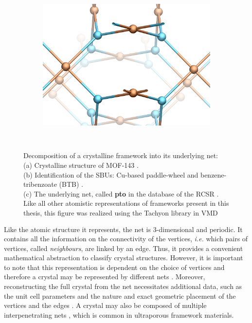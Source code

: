 \documentclass[main.tex]{subfiles}
\begin{document}
\begin{figure}[p]
\begin{subfigure}[t]{0.5\linewidth}
		\includegraphics[width=\linewidth]{figures/topology/mof14_3.jpg}
		\subcaption{}
	\end{subfigure}\\[5mm]
	\caption{Decomposition of a crystalline framework into its underlying net:\\
		(a) Crystalline structure of MOF-143 \autocite{MOF143}.\\
		(b) Identification of the SBUs: Cu-based paddle-wheel \autocite{ReverseTopologicalApproach} and benzene-tribenzoate (BTB) \autocite{BTB}.\\
		(c) The underlying net, called \textbf{pto} in the database of the RCSR \autocite{RCSR}.\\
	Like all other atomistic representations of frameworks present in this thesis, this figure was realized using the Tachyon\autocite{Tachyon} library in VMD\autocite{VMD}} \label{fig:mof}
\end{figure}

Like the atomic structure it represents, the net is 3-dimensional and periodic. It contains all the information on the connectivity of the vertices, \textit{i.e.} which pairs of vertices, called \emph{neighbours}, are linked by an edge. Thus, it provides a convenient mathematical abstraction to classify crystal structures. However, it is important to note that this representation is dependent on the choice of vertices and therefore a crystal may be represented by different nets \autocite{OKeeffe}. Moreover, reconstructing the full crystal from the net necessitates additional data, such as the unit cell parameters and the nature and exact geometric placement of the vertices and the edges \autocite{ReverseTopologicalApproach}. A crystal may also be composed of multiple interpenetrating nets \autocite{interpenetration}, which is common in ultraporous framework materials.
\end{document}
